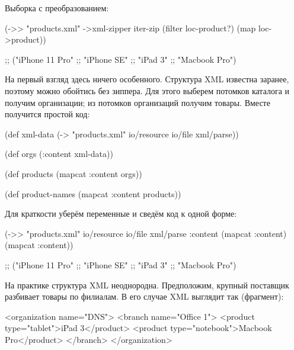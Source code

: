 Выборка с преобразованием:

\begin{english}
  \begin{clojure}
(->> "products.xml"
     ->xml-zipper
     iter-zip
     (filter loc-product?)
     (map loc->product))

;; ("iPhone 11 Pro"
;;  "iPhone SE"
;;  "iPad 3"
;;  "Macbook Pro")
  \end{clojure}
\end{english}

На первый взгляд здесь ничего особенного. Структура XML известна заранее,
поэтому можно обойтись без зиппера. Для этого выберем потомков каталога и
получим организации; из потомков организаций получим товары. Вместе получится
простой код:


\begin{english}
  \begin{clojure}
(def xml-data
  (-> "products.xml"
      io/resource
      io/file
      xml/parse))

(def orgs
  (:content xml-data))

(def products
  (mapcat :content orgs))

(def product-names
  (mapcat :content products))
  \end{clojure}
\end{english}

\pagebreaklarge

Для краткости уберём переменные и сведём код к одной форме:

\begin{english}
  \begin{clojure}
(->> "products.xml"
     io/resource
     io/file
     xml/parse
     :content
     (mapcat :content)
     (mapcat :content))

;; ("iPhone 11 Pro"
;;  "iPhone SE"
;;  "iPad 3"
;;  "Macbook Pro")
  \end{clojure}
\end{english}

На практике структура XML неоднородна. Предположим, крупный поставщик разбивает
товары по филиалам. В его случае XML выглядит так (фрагмент):

\begin{english}
  \begin{xml}
<organization name="DNS">
  <branch name="Office 1">
    <product type="tablet">iPad 3</product>
    <product type="notebook">Macbook Pro</product>
  </branch>
</organization>
  \end{xml}
\end{english}

